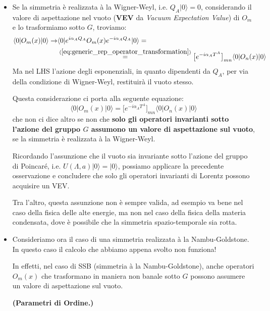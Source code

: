 \documentclass[../main.tex]{subfiles}
\begin{document}
\begin{itemize}
    \item Se la simmetria è realizzata à la Wigner-Weyl, i.e. $Q_A|0\rangle=0$, considerando il valore di aspettazione nel vuoto (\textbf{VEV} da \textit{Vacuum Expectation Value}) di $O_m$ e lo trasformiamo sotto $G$, troviamo:
    \begin{align*}
        \langle 0|O_m(x)|0\rangle \rightarrow  &\langle 0|e^{i\alpha_A Q_A}O_m(x)e^{-i\alpha_A Q_A}|0\rangle=\\
        &\overset{(\ref{eq:generic_rep_operator_transformation})}{=}\big[e^{-i\alpha_A T^A}\big]_{mn}\langle 0|O_n(x)|0\rangle 
    \end{align*}
    Ma nel LHS l'azione degli esponenziali, in quanto dipendenti da $Q_A$, per via della condizione di Wigner-Weyl, restituirà il vuoto stesso. 
    
    Questa considerazione ci porta alla seguente equazione:
    \begin{equation}
        \boxed{\langle 0|O_m(x)|0\rangle = \big[e^{-i\alpha_A T^A}\big]_{mn}\langle 0|O_n(x)|0\rangle }
        \label{eq:Om_VEV}
    \end{equation}
    che non ci dice altro se non che \textbf{solo gli operatori invarianti sotto l'azione del gruppo $G$ assumono un valore di aspettazione sul vuoto}, se la simmetria è realizzata à la Wigner-Weyl.
    \begin{nota}
        Ricordando l'assunzione che il vuoto sia invariante sotto l'azione del gruppo di Poincaré, i.e. $U(\Lambda,a)|0\rangle = |0\rangle$, possiamo applicare la precedente osservazione e concludere che solo gli operatori invarianti di Lorentz possono acquisire un VEV. 

        Tra l'altro, questa assunzione non è sempre valida, ad esempio va bene nel caso della fisica delle alte energie, ma non nel caso della fisica della materia condensata, dove è possibile che la simmetria spazio-temporale sia rotta.
    \end{nota}

    \item Consideriamo ora il caso di una simmetria realizzata à la Nambu-Goldstone. In questo caso il calcolo che abbiamo appena svolto non funziona! 

    In effetti, nel caso di SSB (simmetria à la Nambu-Goldstone), anche operatori $O_m(x)$ che trasformano in maniera non banale sotto $G$ possono assumere un valore di aspettazione sul vuoto. 
    \begin{definition}
        \textbf{(Parametri di Ordine.)}


\end{definition}
\end{itemize}
\end{document}

